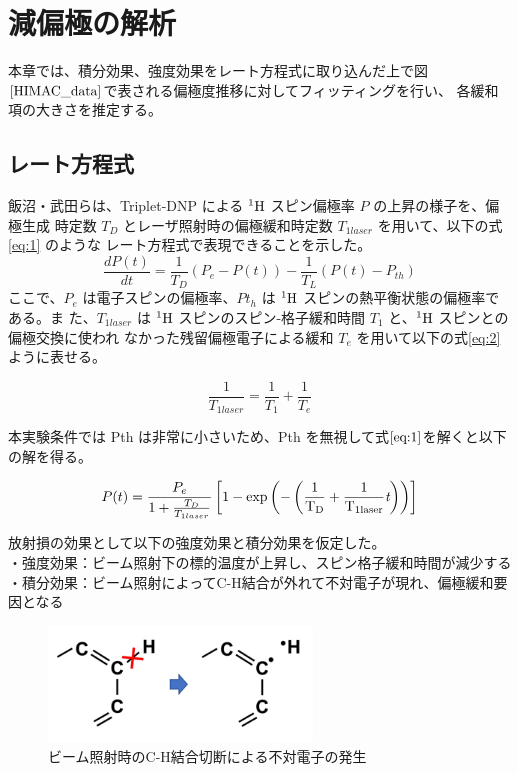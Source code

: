 \chapter{減偏極の解析}
本章では、積分効果、強度効果をレート方程式に取り込んだ上で図$\ref{HIMAC_data}$で表される偏極度推移に対してフィッティングを行い、
各緩和項の大きさを推定する。



\section{レート方程式}
飯沼・武田らは、Triplet-DNP による ${}^{1}\rm{H}$ スピン偏極率 $P$ の上昇の様子を、偏極生成
時定数 $T_D$ とレーザ照射時の偏極緩和時定数 $T_{1laser}$ を用いて、以下の式 \ref{eq:1} のような
レート方程式で表現できることを示した。
\begin{equation}
  \frac{dP(t)}{dt}=\frac{1}{T_D}(P_e-P(t))-\frac{1}{T_L}(P(t)-P_{th})
  \label{eq:1}
\end{equation}
ここで、$P_e$ は電子スピンの偏極率、$Pt_h$ は ${}^1\rm{H}$ スピンの熱平衡状態の偏極率である。ま
た、$T_{1laser}$ は ${}^1\rm{H}$ スピンのスピン-格子緩和時間 $T_1$ と、${}^1\rm{H}$ スピンとの偏極交換に使われ
なかった残留偏極電子による緩和 $T_e$ を用いて以下の式\ref{eq:2}ように表せる。

\begin{equation}
  \frac{1}{T_{1laser}}=\frac{1}{T_1}+\frac{1}{T_e}
  \label{eq:2}
\end{equation}

本実験条件では Pth は非常に小さいため、Pth を無視して式$\ref{eq:1}$を解くと以下の解を得る。

\begin{equation}
  P(t)=\frac{P_e}{1+\frac{T_D}{T_{1laser}}}\left[1-\rm{exp} \left(-\left(\frac{1}{T_D}+\frac{1}{T_{1laser}}\textit{t}\right)\right)\right]
  \label{eq:3}
\end{equation}

放射損の効果として以下の強度効果と積分効果を仮定した。\\
・強度効果：ビーム照射下の標的温度が上昇し、スピン格子緩和時間が減少する\\

・積分効果：ビーム照射によってC-H結合が外れて不対電子が現れ、偏極緩和要因となる\\

\begin{figure}[h]
  \centering
  \includegraphics[width= 7cm]{./chap3/fig/CCbond.png}
  \caption{ビーム照射時のC-H結合切断による不対電子の発生}
  \label{fig:CCbond}
\end{figure}

